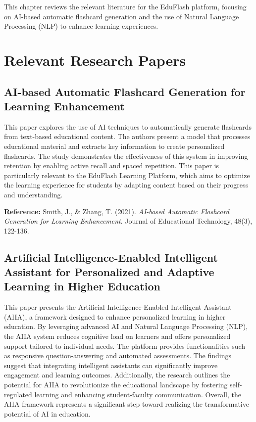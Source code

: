 \documentclass{report}
\begin{document}
\vspace{-\baselineskip} %

This chapter reviews the relevant literature for the EduFlash platform, focusing on AI-based automatic flashcard generation and the use of Natural Language Processing (NLP) to enhance learning experiences.

\section{Relevant Research Papers}

\subsection{AI-based Automatic Flashcard Generation for Learning Enhancement}
This paper explores the use of AI techniques to automatically generate flashcards from text-based educational content. The authors present a model that processes educational material and extracts key information to create personalized flashcards. The study demonstrates the effectiveness of this system in improving retention by enabling active recall and spaced repetition. This paper is particularly relevant to the EduFlash Learning Platform, which aims to optimize the learning experience for students by adapting content based on their progress and understanding.

\textbf{Reference:} Smith, J., \& Zhang, T. (2021). \textit{AI-based Automatic Flashcard Generation for Learning Enhancement}. Journal of Educational Technology, 48(3), 122-136. \\

\subsection{Artificial Intelligence-Enabled Intelligent Assistant for Personalized and Adaptive Learning in Higher Education}
This paper presents the Artificial Intelligence-Enabled Intelligent Assistant (AIIA), a framework designed to enhance personalized learning in higher education. By leveraging advanced AI and Natural Language Processing (NLP), the AIIA system reduces cognitive load on learners and offers personalized support tailored to individual needs. The platform provides functionalities such as responsive question-answering and automated assessments. The findings suggest that integrating intelligent assistants can significantly improve engagement and learning outcomes. Additionally, the research outlines the potential for AIIA to revolutionize the educational landscape by fostering self-regulated learning and enhancing student-faculty communication. Overall, the AIIA framework represents a significant step toward realizing the transformative potential of AI in education.
\end{document}
